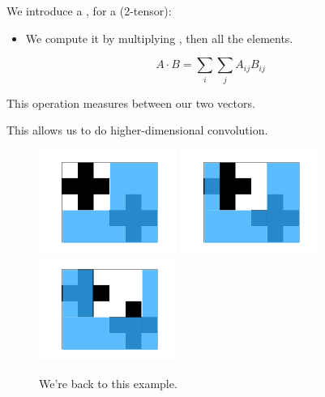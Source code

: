         \begin{definition}
            We introduce a , for a  (2-tensor):

            \begin{itemize}
                \item We compute it by multiplying , then  all the elements.
            \end{itemize}

            \begin{equation*}
                A \cdot B = \sum_{i} \sum_j A_{ij} B_{ij}
            \end{equation*}

            This operation measures  between our two vectors.
        \end{definition}

        This allows us to do higher-dimensional convolution.

        \begin{figure}[H]
            \includegraphics[width=45mm,scale=0.5]{images/convolutional_neural_networks_images/window.png}
            \includegraphics[width=45mm,scale=0.5]{images/convolutional_neural_networks_images/window2.png}
            \includegraphics[width=45mm,scale=0.5]{images/convolutional_neural_networks_images/window3.png}
            
            \caption*{We're back to this example.}
        \end{figure}

